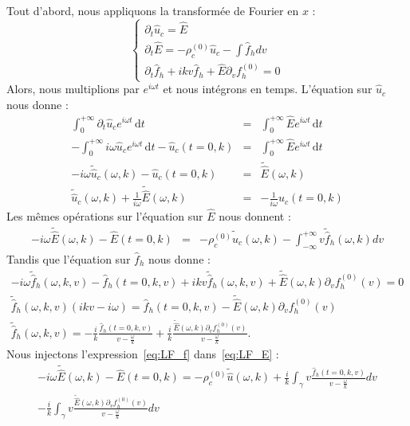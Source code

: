 Tout d'abord, nous appliquons la transformée de Fourier en $x$ :
\begin{equation}
  \begin{cases}
    \partial_t \hat{u}_c = \hat{E} \\
    \partial_t\hat{E}=-\rho_c^{(0)}\hat{u}_c-\int \hat{f}_h dv \\
    \partial_t \hat{f}_h+ikv\hat{f}_h+ \hat{E}\partial_v f_h^{(0)} = 0
  \end{cases}
  \label{eq:fourierH}
\end{equation}
Alors, nous multiplions par $e^{i\omega t}$ et nous intégrons en temps. L'équation sur $\hat{u}_c$ nous donne :
\begin{eqnarray}
  \int_0^{+\infty} \partial_t \hat{u}_c e^{i\omega t} \,\mathrm{d}t &=& \int_0^{+\infty} \hat{E}e^{i\omega t}\,\mathrm{d}t\nonumber\\
  -\int_0^{+\infty}i\omega  \hat{u}_c e^{i\omega t} \,\mathrm{d}t-\hat{u}_c(t=0,k) &=& \int_0^{+\infty} \hat{E}e^{i\omega t}\,\mathrm{d}t\nonumber\\
  -i\omega  \tilde{\hat{u}}_c(\omega,k)-\hat{u}_c(t=0,k) &=& \tilde{\hat{E}}(\omega,k)\nonumber\\
  \tilde{\hat{u}}_c(\omega,k)+\frac{1}{i\omega}\tilde{\hat{E}}(\omega,k) &=& -\frac{1}{i\omega}\hat{u}_c(t=0,k)
  \label{eq:LF_u}
\end{eqnarray}
Les mêmes opérations sur l'équation sur $\hat{E}$ nous donnent :
\begin{eqnarray}
  -i\omega  \tilde{\hat{E}}(\omega,k)-\hat{E}(t=0,k)&=&-\rho_c^{(0)}\tilde{\hat{u}}_c(\omega,k)-\int_{-\infty}^{+\infty} v\tilde{\hat{f}}_h(\omega,k)dv
  \label{eq:LF_E}
\end{eqnarray}
Tandis que l'équation sur $\hat{f}_h$ nous donne :
\begin{eqnarray}
  -i\omega  \tilde{\hat{f}}_h(\omega,k,v)-\hat{f}_h(t=0,k,v)+ikv\tilde{\hat{f}}_h(\omega,k,v)+\tilde{\hat{E}}(\omega,k)\partial_vf_h^{(0)}(v)=0\nonumber\\
  \tilde{\hat{f}}_h(\omega,k,v)\left(ikv-i\omega\right)=\hat{f}_h(t=0,k,v)-\tilde{\hat{E}}(\omega,k)\partial_vf_h^{(0)}(v)\nonumber\\
  \tilde{\hat{f}}_h(\omega,k,v)=-\frac{i}{k}\frac{\hat{f}_h(t=0,k,v)}{v-\frac{\omega}{k}}+\frac{i}{k}\frac{\tilde{\hat{E}}(\omega,k)\partial_vf_h^{(0)}(v)}{v-\frac{\omega}{k}}.
  \label{eq:LF_f}
\end{eqnarray}
Nous injectons l'expression~\eqref{eq:LF_f} dans~\eqref{eq:LF_E} :
$$
  \begin{aligned}
    -i\omega  \tilde{\hat{E}}(\omega,k)-\hat{E}(t=0,k)=-\rho_c^{(0)}\tilde{\hat{u}}(\omega,k)+\frac{i}{k}\int_\gamma v\frac{\hat{f}_h(t=0,k,v)}{v-\frac{\omega}{k}}dv \\
    -\frac{i}{k}\int_\gamma v\frac{\tilde{\hat{E}}(\omega,k)\partial_vf_h^{(0)}(v)}{v-\frac{\omega}{k}}dv
  \end{aligned}
$$
